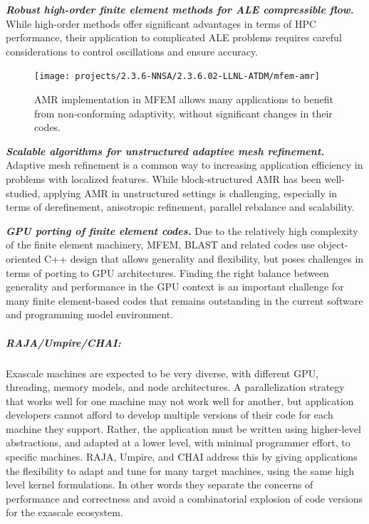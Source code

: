 \noindent
{\bf \em Robust high-order finite element methods for ALE compressible flow.}
While high-order methods offer significant advantages in terms of HPC performance,
their application to complicated ALE problems requires careful considerations to
control oscillations and ensure accuracy.

\begin{figure}[htb]
\centering
\texttt{[image: projects/2.3.6-NNSA/2.3.6.02-LLNL-ATDM/mfem-amr]}
\caption{\label{fig:mfem-amr}AMR implementation in MFEM allows many applications to benefit from non-conforming adaptivity, without significant changes in their codes.}
\end{figure}

\noindent
{\bf \em Scalable algorithms for unstructured adaptive mesh refinement.}
Adaptive mesh refinement is a common way to increasing application efficiency
in problems with localized features. While block-structured AMR has been
well-studied, applying AMR in unstructured settings is challenging, especially
in terms of derefinement, anisotropic refinement, parallel rebalance and
scalability.

\noindent
{\bf \em GPU porting of finite element codes.}
Due to the relatively high complexity of the finite element machinery, MFEM,
BLAST and related codes use object-oriented C++ design that allows generality
and flexibility, but poses challenges in terms of porting to GPU architectures.
Finding the right balance between generality and performance in the GPU context
is an important challenge for many finite element-based codes that remains
outstanding in the current software and programming model environment.

\subparagraph{RAJA/Umpire/CHAI:}
Exascale machines are expected to be very diverse, with different GPU,
threading, memory models, and node architectures.  A parallelization
strategy that works well for one machine may not work well for another,
but application developers cannot afford to develop multiple versions of
their code for each machine they support.  Rather, the application must
be written using higher-level abstractions, and adapted at a lower level,
with minimal programmer effort, to specific machines.  RAJA, Umpire, and
CHAI address this by giving applications the flexibility to adapt and
tune for many target machines, using the same high level kernel
formulations.  In other words they separate the concerns of performance
and correctness and avoid a combinatorial explosion of code versions for
the exascale ecosystem.

